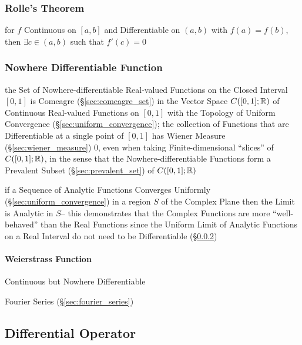 \subsubsection{Rolle's Theorem}\label{sec:rolles_theorem}

for $f$ Continuous on $[a,b]$ and Differentiable on $(a,b)$ with $f(a)
= f(b)$, then $\exists c \in (a,b)$ such that $f'(c) = 0$



\subsubsection{Nowhere Differentiable Function}
\label{sec:nowhere_differentiable}

the Set of Nowhere-differentiable Real-valued Functions on the Closed Interval
$[0,1]$ is Comeagre (\S\ref{sec:comeagre_set}) in the Vector Space $C([0,1];
\mathbb{R})$ of Continuous Real-valued Functions on $[0,1]$ with the Topology of
Uniform Convergence (\S\ref{sec:uniform_convergence}); the collection of
Functions that are Differentiable at a single point of $[0,1]$ has Wiener
Measure (\S\ref{sec:wiener_measure}) $0$, even when taking Finite-dimensional
``slices'' of $C([0,1];\mathbb{R})$, in the sense that the Nowhere-differentiable
Functions form a Prevalent Subset (\S\ref{sec:prevalent_set}) of
$C([0,1]; \mathbb{R})$

if a Sequence of Analytic Functions Converges Uniformly
(\S\ref{sec:uniform_convergence}) in a region $S$ of the Complex Plane then the
Limit is Analytic in $S$-- this demonstrates that the Complex Functions are
more ``well-behaved'' than the Real Functions since the Uniform Limit of
Analytic Functions on a Real Interval do not need to be Differentiable
(\S\ref{sec:nowhere_differentiable})



\paragraph{Weierstrass Function}\label{sec:weierstrass_function}\hfill

Continuous but Nowhere Differentiable

Fourier Series (\S\ref{sec:fourier_series})



\subsection{Differential Operator}\label{sec:differential_operator}

